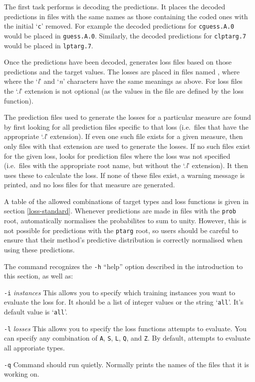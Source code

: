 The first task \mloss{} performs is decoding the predictions.  It
places the decoded predictions in files with the same names as those
containing the coded ones with the initial `\texttt{c}' removed. For
example the decoded predictions for \texttt{cguess.A.0} would be placed
in \texttt{guess.A.0}.  Similarly, the decoded predictions for
\texttt{clptarg.7} would be placed in \texttt{lptarg.7}.

Once the predictions have been decoded, \mloss{} generates loss files
based on those predictions and the target values.  The losses are
placed in files named , where where the `\textit{l}'
and `\textit{n}' characters have the same meanings as above. For loss
files the `.\textit{l}' extension is not optional (as the values in
the file are defined by the loss function).

The prediction files used to generate the losses for a particular
measure are found by first looking for all prediction files specific
to that loss (i.e.~files that have the appropriate `.\textit{l}'
extension). If even one such file exists for a given measure, then
only files with that extension are used to generate the losses.  If no
such files exist for the given loss, \mloss{} looks for prediction
files where the loss was not specified (i.e.~files with the
appropriate root name, but without the `.\textit{l}' extension). It
then uses these to calculate the loss. If none of these files exist,
a warning message is printed, and no loss files for that measure are
generated.

A table of the allowed combinations of target types and loss functions
is given in section \ref{loss-standard}. Whenever predictions are made
in files with the \texttt{prob} root, \mloss{} automatically
normalises the probabilites to sum to unity. However, this is not
possible for predictions with the \texttt{ptarg} root, so users should
be careful to ensure that their method's predictive distribution is
correctly normalised when using these predictions.

The \mloss{} command recognizes the \texttt{-h} ``help'' option
described in the introduction to this section, as well
as:\vspace{-4pt}
\begin{list}{}{\setlength{\leftmargin}{0.6in}\setlength{\labelsep}{0.2in}}
\item[{\tt -i} {\rm\em instances}] 
    This allows you to specify which training instances you want to
    evaluate the loss for.  It should be a list of integer values or
    the string `\texttt{all}'.  It's default value is `\texttt{all}'.
\item[{\tt -l} {\rm\em losses}] 
    This allows you to specify the loss functions \mloss{} attempts to
    evaluate. You can specify any combination of \texttt{A}, \texttt{S},
    \texttt{L}, \texttt{Q}, and \texttt{Z}. By default, \mloss{} attempts to
    evaluate all approriate types.
\item[{\tt -q}]
    Command should run quietly. Normally \mloss{} prints the names of the
files that it is working on.
\end{list}

